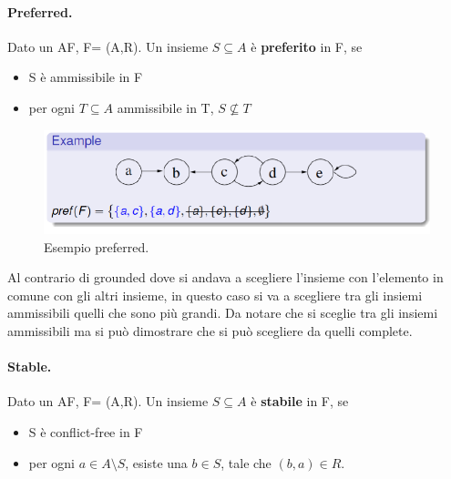 \paragraph{Preferred.} Dato un AF, F= (A,R). Un insieme $S\subseteq A$ è \textbf{preferito} in F, se 
\begin{itemize}
    \item S è ammissibile in F
    \item per ogni $T\subseteq A$ ammissibile in T, $S\nsubseteq T$
\end{itemize}


\begin{figure}[H]
    \centering
    \includegraphics[width=13cm, keepaspectratio]{img/es_preferred.png}
    \caption{Esempio preferred.}\label{fig:es_insieme_preferred}
\end{figure}

Al contrario di grounded dove si andava a scegliere l'insieme con l'elemento in comune con gli altri insieme, in questo caso si va a scegliere tra gli insiemi ammissibili quelli che sono più grandi. Da notare che si sceglie tra gli insiemi ammissibili ma si può dimostrare che si può scegliere da quelli complete.

\paragraph{Stable.} Dato un AF, F= (A,R). Un insieme $S\subseteq A$ è \textbf{stabile} in F, se
\begin{itemize}
    \item S è conflict-free in F
    \item per ogni $a\in A\setminus S$, esiste una $b\in S$, tale che $(b,a)\in R$. 
\end{itemize}


